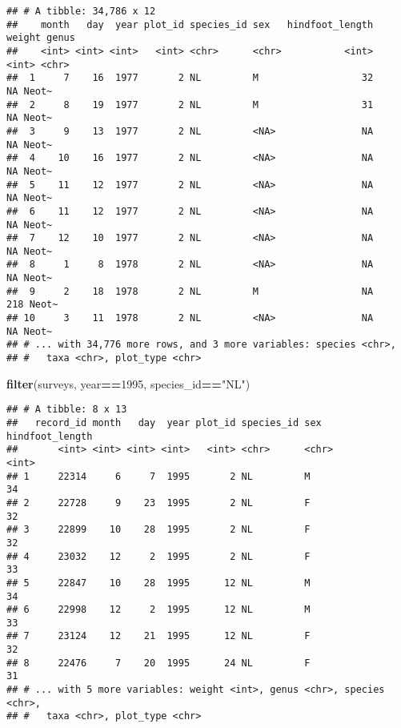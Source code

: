 \documentclass[]{article}
\newenvironment{Shaded}{\begin{snugshade}}{\end{snugshade}}
\newcommand{\KeywordTok}[1]{\textcolor[rgb]{0.13,0.29,0.53}{\textbf{#1}}}
\newcommand{\DecValTok}[1]{\textcolor[rgb]{0.00,0.00,0.81}{#1}}
\newcommand{\StringTok}[1]{\textcolor[rgb]{0.31,0.60,0.02}{#1}}
\newcommand{\OperatorTok}[1]{\textcolor[rgb]{0.81,0.36,0.00}{\textbf{#1}}}
\newcommand{\NormalTok}[1]{#1}
\begin{document}
\begin{verbatim}
## # A tibble: 34,786 x 12
##    month   day  year plot_id species_id sex   hindfoot_length weight genus
##    <int> <int> <int>   <int> <chr>      <chr>           <int>  <int> <chr>
##  1     7    16  1977       2 NL         M                  32     NA Neot~
##  2     8    19  1977       2 NL         M                  31     NA Neot~
##  3     9    13  1977       2 NL         <NA>               NA     NA Neot~
##  4    10    16  1977       2 NL         <NA>               NA     NA Neot~
##  5    11    12  1977       2 NL         <NA>               NA     NA Neot~
##  6    11    12  1977       2 NL         <NA>               NA     NA Neot~
##  7    12    10  1977       2 NL         <NA>               NA     NA Neot~
##  8     1     8  1978       2 NL         <NA>               NA     NA Neot~
##  9     2    18  1978       2 NL         M                  NA    218 Neot~
## 10     3    11  1978       2 NL         <NA>               NA     NA Neot~
## # ... with 34,776 more rows, and 3 more variables: species <chr>,
## #   taxa <chr>, plot_type <chr>
\end{verbatim}

\begin{Shaded}
\begin{Highlighting}[]
\KeywordTok{filter}\NormalTok{(surveys, year}\OperatorTok{==}\DecValTok{1995}\NormalTok{,}
\NormalTok{       species_id}\OperatorTok{==}\StringTok{"NL"}\NormalTok{)}
\end{Highlighting}
\end{Shaded}

\begin{verbatim}
## # A tibble: 8 x 13
##   record_id month   day  year plot_id species_id sex   hindfoot_length
##       <int> <int> <int> <int>   <int> <chr>      <chr>           <int>
## 1     22314     6     7  1995       2 NL         M                  34
## 2     22728     9    23  1995       2 NL         F                  32
## 3     22899    10    28  1995       2 NL         F                  32
## 4     23032    12     2  1995       2 NL         F                  33
## 5     22847    10    28  1995      12 NL         M                  34
## 6     22998    12     2  1995      12 NL         M                  33
## 7     23124    12    21  1995      12 NL         F                  32
## 8     22476     7    20  1995      24 NL         F                  31
## # ... with 5 more variables: weight <int>, genus <chr>, species <chr>,
## #   taxa <chr>, plot_type <chr>
\end{verbatim}
\end{document}
